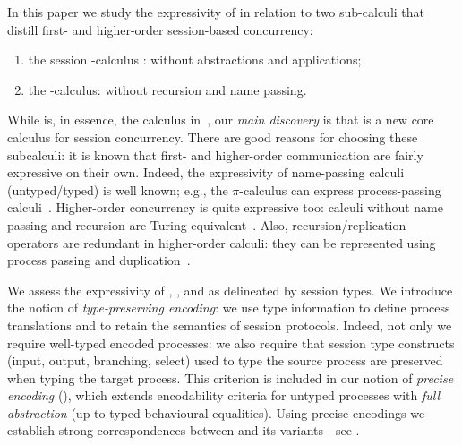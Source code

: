In this paper we study the expressivity of \HOp in relation to two  sub-calculi
that distill first- and higher-order session-based concurrency:
\begin{enumerate}[-]
\item the session \sessp-calculus : \HOp without abstractions and applications;
\item the \HO-calculus: \HOp without recursion and name passing.
\end{enumerate}
While \sessp is, 
in essence, the calculus in~\cite{honda.vasconcelos.kubo:language-primitives}, 
our \emph{main discovery} is 
that \HO  is a new core calculus 
for %
session concurrency.
There are good reasons for choosing these subcalculi: %
it is known
that
 first- and higher-order com\-mu\-ni\-cation %
are fairly expressive on their own.
Indeed, the expressivity of name-passing calculi (untyped/typed) is well known; e.g., the $\pi$-calculus can express 
process-passing calculi~\cite{SangiorgiD:expmpa}. 
Higher-order concurrency is quite expressive too: 
calculi without name passing and recursion are Turing equivalent~\cite{DBLP:journals/iandc/LanesePSS11}.
Also, 
recursion/replication operators are redundant in higher-order calculi: they can be represented using process passing and duplication~\cite{ThomsenB:plachoasgcfhop}. 








We assess the expressivity  of \HOp, \HO, and \sessp as delineated by session types. 
We introduce the notion of \emph{type-preserving encoding}:
we use type information to define process translations
and to retain the semantics of session protocols. 
Indeed,  not only we require well-typed encoded processes: 
we also require that session type constructs (input, output, branching, select) used to type the source process
are preserved when typing the target process.
This criterion is included in 
our notion of \emph{precise encoding} (), which 
extends encodability criteria for untyped processes with 
\emph{full abstraction} (up to 
typed behavioural equalities). 
Using precise encodings we establish strong correspondences between 
\HOp and its variants---see . 



